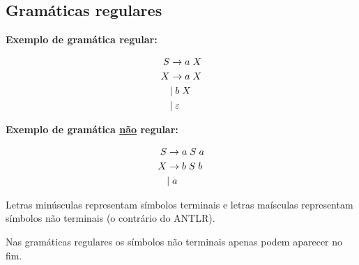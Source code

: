 \documentclass{article}
\begin{document}
\subsection{Gramáticas regulares}

\begin{flushleft}
  \textbf{Exemplo de gramática regular:}

  \begin{align*}
      S & \rightarrow a\hspace{1mm} X \\
      X & \rightarrow a\hspace{1mm} X \\
      & | \hspace{1mm}b\hspace{1mm} X \\
      & | \hspace{1mm} \varepsilon
  \end{align*}
\end{flushleft}

\begin{flushleft}
  \textbf{Exemplo de gramática \uline{não} regular:}

  \begin{align*}
      S & \rightarrow a\hspace{1mm} S\hspace{1mm} a\\
      X & \rightarrow b\hspace{1mm} S\hspace{1mm} b \\
      & | \hspace{1mm} a \\
  \end{align*}

  \item Letras minúsculas representam símbolos terminais e letras maísculas
  representam símbolos não terminais (o contrário do ANTLR).

  \item Nas gramáticas regulares os símbolos não terminais apenas podem aparecer no
  fim.
\end{flushleft}

\pagebreak
\end{document}
